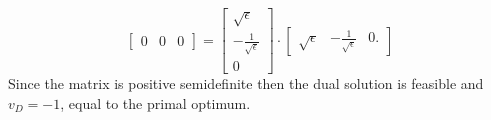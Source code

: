\documentclass[a4paper,twoside,justified]{tufte-handout}
\begin{document}
\begin{example}
\begin{equation}
\begin{bmatrix}
      0 & 0 & 0
    \end{bmatrix} = \begin{bmatrix}
      \sqrt{\epsilon} \\
      -\frac{1}{\sqrt{\epsilon}}\\
      0
    \end{bmatrix}
    \cdot
    \begin{bmatrix}
      \sqrt{\epsilon} & -\frac{1}{\sqrt{\epsilon}} & 0.
    \end{bmatrix}
  \end{equation}
  Since the matrix is positive semidefinite then the dual solution is
  feasible and $ v_{D}=-1 $, equal to the primal optimum.
\end{example}





\end{document}
